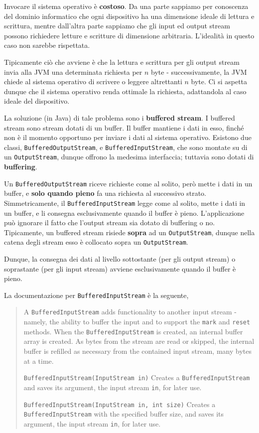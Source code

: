 \documentclass[\fontsizeclass,twocolumn]{\classname}
\theoremstyle{definition}
\theoremstyle{definition}
\begin{document}
Invocare il sistema operativo è \textbf{costoso}.
Da una parte sappiamo per conoscenza del dominio informatico che ogni
dispositivo ha una dimensione ideale di lettura e scrittura, mentre dall'altra
parte sappiamo che gli input ed output stream possono richiedere letture e
scritture di dimensione arbitraria. L'idealità in questo caso non sarebbe
rispettata. 

Tipicamente ciò che avviene è che la lettura e scrittura per gli output stream
invia alla JVM una determinata richiesta per $n$ byte \-- successivamente, la
JVM chiede al sistema operativo di scrivere o leggere altrettanti $n$ byte. Ci
si aspetta dunque che il sistema operativo renda ottimale la richiesta,
adattandola al caso ideale del dispositivo.

La soluzione (in Java) di tale problema sono i \textbf{buffered stream}. I
buffered stream sono stream dotati di un buffer. Il buffer mantiene i dati in
esso, finché non è il momento opportuno per inviare i dati al sistema
operativo. Esistono due classi, \texttt{BufferedOutputStream}, e
\texttt{BufferedInputStream}, che sono montate su di un
\texttt{Output\-Stream}, dunque offrono la medesima interfaccia; tuttavia sono
dotati di \textbf{buffering}.

Un \texttt{BufferedOutputStream} riceve richieste come al solito, però mette i
dati in un buffer, e \textbf{solo quando pieno} fa una richiesta al successivo
strato. Simmetricamente, il \texttt{BufferedInputStream} legge come al solito,
mette i dati in un buffer, e li consegna esclusivamente quando il buffer è
pieno. L'applicazione può ignorare il fatto che l'output stream sia dotato di
buffering o no. Tipicamente, un buffered stream risiede \textbf{sopra} ad un
\texttt{Output\-Stream}, dunque nella catena degli stream esso è collocato sopra
un \texttt{Output\-Stream}.

Dunque, la consegna dei dati al livello sottostante (per gli output stream) o
soprastante (per gli input stream) avviene esclusivamente quando il buffer è
pieno.

La documentazione per \texttt{BufferedInputStream} è la seguente,

\begin{quote}
    \footnotesize{A \texttt{BufferedInputStream} adds functionality to another input
        stream \-- namely, the ability to buffer the input and to support the \texttt{mark} and
        \texttt{reset} methods. When the \texttt{BufferedInputStream} is created, an internal buffer
array is created. As bytes from the stream are read or skipped, the internal
buffer is refilled as necessary from the contained input stream, many bytes at
a time.

\texttt{BufferedInputStream(InputStream in)} 	Creates a \texttt{BufferedInputStream}
and saves its argument, the input stream \texttt{in}, for later use.

\texttt{BufferedInputStream(InputStream in, int size)} 	Creates a
\texttt{BufferedInputStream} with the specified buffer size, and saves its argument, the
input stream \texttt{in}, for later use.
}
\end{quote}
\end{document}
